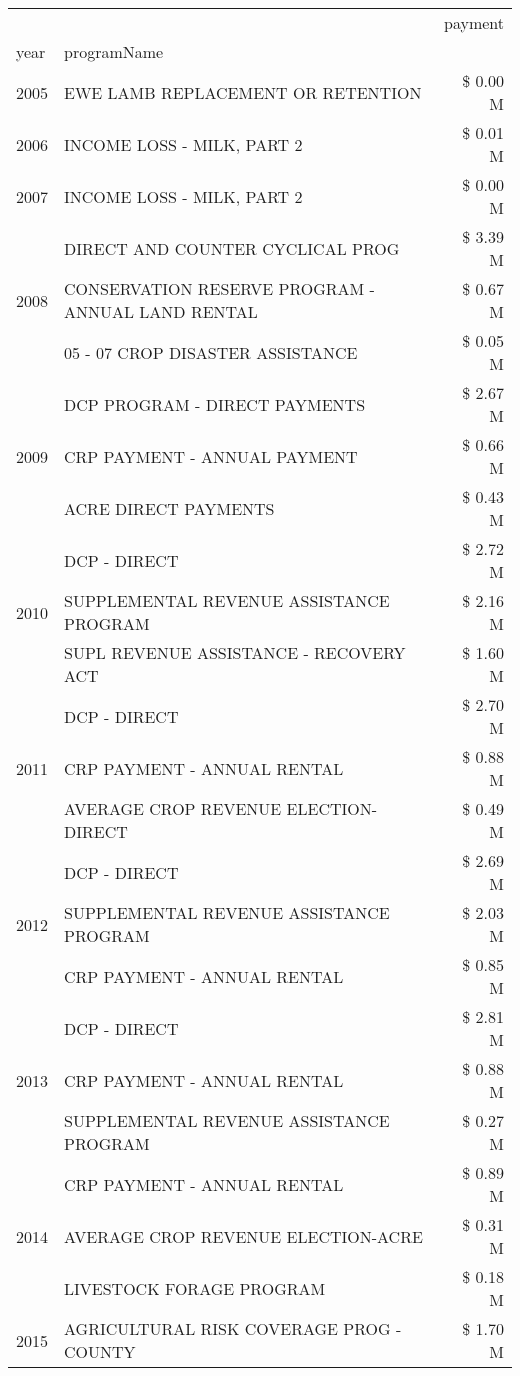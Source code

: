 \begin{tabular}{llr}
\toprule
 &  & payment \\
year & programName &  \\
\midrule
2005 & EWE LAMB REPLACEMENT OR RETENTION & \$ 0.00 M \\
\cline{1-3}
2006 & INCOME LOSS - MILK, PART 2 & \$ 0.01 M \\
\cline{1-3}
2007 & INCOME LOSS - MILK, PART 2 & \$ 0.00 M \\
\cline{1-3}
\multirow[t]{3}{*}{2008} & DIRECT AND COUNTER CYCLICAL PROG & \$ 3.39 M \\
 & CONSERVATION RESERVE PROGRAM - ANNUAL LAND RENTAL & \$ 0.67 M \\
 & 05 - 07 CROP DISASTER ASSISTANCE & \$ 0.05 M \\
\cline{1-3}
\multirow[t]{3}{*}{2009} & DCP PROGRAM - DIRECT PAYMENTS & \$ 2.67 M \\
 & CRP PAYMENT - ANNUAL PAYMENT & \$ 0.66 M \\
 & ACRE DIRECT PAYMENTS & \$ 0.43 M \\
\cline{1-3}
\multirow[t]{3}{*}{2010} & DCP - DIRECT & \$ 2.72 M \\
 & SUPPLEMENTAL REVENUE ASSISTANCE PROGRAM & \$ 2.16 M \\
 & SUPL REVENUE ASSISTANCE - RECOVERY ACT & \$ 1.60 M \\
\cline{1-3}
\multirow[t]{3}{*}{2011} & DCP - DIRECT & \$ 2.70 M \\
 & CRP PAYMENT - ANNUAL RENTAL & \$ 0.88 M \\
 & AVERAGE CROP REVENUE ELECTION-DIRECT & \$ 0.49 M \\
\cline{1-3}
\multirow[t]{3}{*}{2012} & DCP - DIRECT & \$ 2.69 M \\
 & SUPPLEMENTAL REVENUE ASSISTANCE PROGRAM & \$ 2.03 M \\
 & CRP PAYMENT - ANNUAL RENTAL & \$ 0.85 M \\
\cline{1-3}
\multirow[t]{3}{*}{2013} & DCP - DIRECT & \$ 2.81 M \\
 & CRP PAYMENT - ANNUAL RENTAL & \$ 0.88 M \\
 & SUPPLEMENTAL REVENUE ASSISTANCE PROGRAM & \$ 0.27 M \\
\cline{1-3}
\multirow[t]{3}{*}{2014} & CRP PAYMENT - ANNUAL RENTAL & \$ 0.89 M \\
 & AVERAGE CROP REVENUE ELECTION-ACRE & \$ 0.31 M \\
 & LIVESTOCK FORAGE PROGRAM & \$ 0.18 M \\
\cline{1-3}
\multirow[t]{3}{*}{2015} & AGRICULTURAL RISK COVERAGE PROG - COUNTY & \$ 1.70 M \\

\end{tabular}
